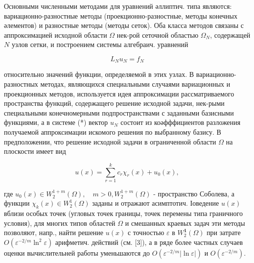 \documentclass[10pt]{article}
\begin{document}
Основными численными методами для уравнений әллиптич. типа являются: вариационно-разностные методы (проекционно-разностные, методы конечных әлементов) и разностные методы (методы сеток). Оба класса методов связаны с аппроксимацией исходной области $\Omega$ нек-рой сеточной областью $\Omega_{N}$, содержащей $N$ узлов сетки, и построением системы алгебраич. уравнений



\[

L_{N} u_{N}=f_{N}

\]



относительно значений функции, определяемой в этих узлах. В вариационно-разностных методах, являющихся специальными случаями вариационных и проекционных методов, используется идея аппроксимации рассматриваемого пространства функций, содержащего решение исходной задачи, нек-рыми специальными конечномерными подпространствами с заданными базисными функциями, а в системе (*) вектор $u_{N}$ состоит из коәфффициентов разложения получаемой аппроксимации искомого решения по выбранному базису. В предположении, что решение исходной задачи в ограниченной области $\Omega$ на плоскости имеет вид



\[

u(x)=\sum_{r=1}^{k} c_{r} \chi_{r}(x)+u_{0}(x),

\]



где $u_{0}(x) \in W_{2}^{1+m}(\Omega), \quad m>0, W_{2}^{1+m}(\Omega)$ - пространство Соболева, а функции $\chi_{k}(x) \in W_{2}^{1}(\Omega)$ заданы и отражают асимптотич. Іоведение $u(x)$ вблизи особых точек (угловых точек границы, точек перемены типа граничного условия), для многих типов областей $\Omega$ и смешанных краевых задач эти методы позволяют, напр., найти решение $u(x)$ с точностью $\varepsilon$ в $W_{2}^{\mathbf{1}}(\Omega)$ при затрате $O\left(\varepsilon^{-2 / m} \ln ^{2} \varepsilon\right)$ арифметич. действий (см. [3]), а в ряде более частных случаев оценки вычислительней работы уменьшаются до $O\left(\varepsilon^{-2 / m}|\ln \varepsilon|\right)$ и $O\left(\varepsilon^{-2 / m}\right)$.
\end{document}
